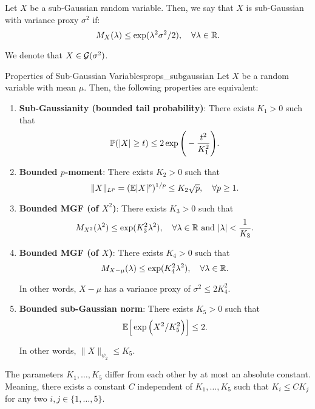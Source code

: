 \begin{definition}
	Let $X$ be a sub-Gaussian random variable. Then, we say that $X$ is sub-Gaussian with variance proxy $\sigma^2$ if:
	\begin{equation}
		M_X(\lambda) \le \exp(\lambda^2\sigma^2/2), \quad \forall \lambda\in\mathbb{R}.	
	\end{equation} 

	\noindent We denote that $X\in\mathcal{G}(\sigma^2)$.
\end{definition} 

\begin{proposition}{Properties of Sub-Gaussian Variables}{props_subgaussian}
	Let $X$ be a random variable with mean $\mu$. Then, the following properties are equivalent:

	\begin{enumerate}[label=(\roman*)]
		\item \textbf{Sub-Gaussianity (bounded tail probability)}: There exists $K_1>0$ such that
		\begin{equation}
			\mathbb{P}(|X| \ge t) \le 2\exp\Bigg( -\frac{t^2}{K_1^2} \Bigg).		
		\end{equation} 	

		\item \textbf{Bounded $p$-moment}: There exists $K_2>0$ such that
		\begin{equation}
			\|X\|_{L^p} = (\mathbb{E} |X|^p)^{1/p} \le K_2\sqrt{p}, \quad \forall p \ge 1.	
		\end{equation} 

		\item \textbf{Bounded MGF (of $X^2$)}: There exists $K_3>0$ such that
		\begin{equation}
			M_{X^2}(\lambda^2) \le \exp(K_3^2\lambda^2), \quad \forall \lambda\in\mathbb{R} \text{ and } |\lambda| < \frac{1}{K_3}.	
		\end{equation} 

		\item \textbf{Bounded MGF (of $X$)}: There exists $K_4>0$ such that
		\begin{equation}
			M_{X-\mu}(\lambda) \le \exp(K_4^2\lambda^2), \quad \forall \lambda\in\mathbb{R}.
		\end{equation}

		\noindent In other words, $X-\mu$ has a variance proxy of $\sigma^2\le 2K_4^2$.

		\item \textbf{Bounded sub-Gaussian norm}: There exists $K_5>0$ such that
		\begin{equation}
			\mathbb{E}\Big[ \exp\Big( X^2/K_5^2 \Big) \Big]\le 2.
		\end{equation} 

		\noindent In other words, $\|X\|_{\psi_2}\le K_5$.
	\end{enumerate} 

	\noindent The parameters $K_1, \dots, K_5$ differ from each other by at most an absolute constant. Meaning, there exists a constant $C$ independent of $K_1, \dots, K_5$ such that $K_i \le C K_j$ for any two $i,j \in \{1, \dots, 5\}$.
\end{proposition} 

